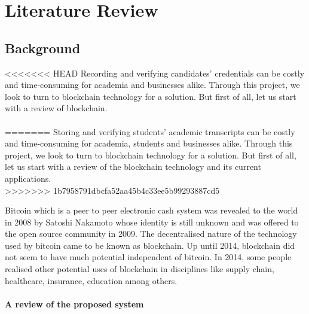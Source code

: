 \chapter{Literature Review}

\section{Background}

<<<<<<< HEAD
Recording and verifying candidates' credentials can be costly and time-consuming for academia and businesses alike. Through this project, we look to turn to blockchain technology for a solution. But first of all, let us start with a review of blockchain.\\~\\
=======
Storing and verifying students' academic transcripts can be costly and time-consuming for academia, students and businesses alike. Through this project, we look to turn to blockchain technology for a solution. But first of all, let us start with a review of the blockchain technology and its current applications.\\
>>>>>>> 1b7958791dbcfa52aa45b4c33ee5b99293887cd5

Bitcoin which is a peer to peer electronic cash system was revealed to the world in 2008 by Satoshi Nakamoto whose identity is still unknown and was offered to the open source community in 2009. The decentralised nature of the technology used by bitcoin came to be known as blockchain. 
Up until 2014, blockchain did not seem to have much potential independent of bitcoin. In 2014, some people realised other potential uses of blockchain in disciplines like supply chain, healthcare, insurance, education among others. 


\subsubsection{A review of the proposed system}

